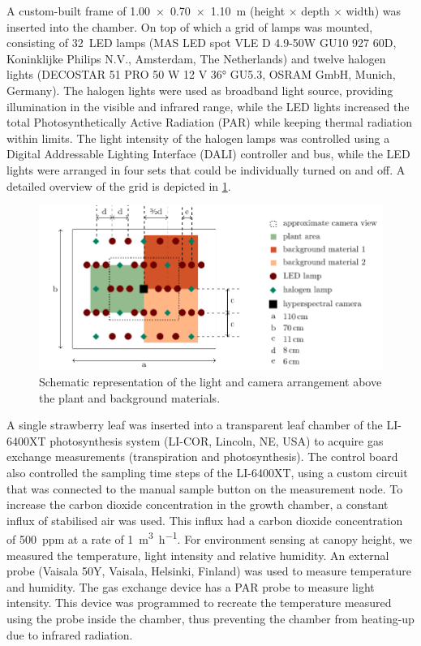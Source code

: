 \documentclass[10pt,authoryear,a4paper]{elsarticle}
\begin{document}
        A custom-built frame of \SI[product-units = single]{1.00 x 0.70 x 1.10}{\metre} (height $\times$ depth $\times$ width) was inserted into the chamber. On top of which a grid of lamps was mounted, consisting of 32~LED lamps (MAS LED spot VLE D 4.9-50W GU10 927 60D, Koninklijke Philips N.V., Amsterdam, The Netherlands) and twelve halogen lights (DECOSTAR 51 PRO 50 W 12 V \ang{36} GU5.3, OSRAM GmbH, Munich, Germany). The halogen lights were used as broadband light source, providing illumination in the visible and infrared range, while the LED lights increased the total Photosynthetically Active Radiation (PAR) while keeping thermal radiation within limits. The light intensity of the halogen lamps was controlled using a Digital Addressable Lighting Interface (DALI) controller and bus, while the LED lights were arranged in four sets that could be individually turned on and off. A detailed overview of the grid is depicted in \cref{lamp-configuration}.
        
        \begin{figure}[thb]
            \centering
            \includegraphics{figures/lamp-layout}
            \caption{Schematic representation of the light and camera arrangement above the plant and background materials.}
            \label{lamp-configuration}
        \end{figure}
        
        A single strawberry leaf was inserted into a transparent leaf chamber of the LI-6400XT photosynthesis system (LI-COR, Lincoln, NE, USA) to acquire gas exchange measurements (transpiration and photosynthesis). The control board also controlled the sampling time steps of the LI-6400XT, using a custom circuit that was connected to the manual sample button on the measurement node. To increase the carbon dioxide concentration in the growth chamber, a constant influx of stabilised air was used. This influx had a carbon dioxide concentration of \SI{500}{ppm} at a rate of \SI{1}{\cubic\metre \per\hour}. For environment sensing at canopy height, we measured the temperature, light intensity and relative humidity. An external probe (Vaisala 50Y, Vaisala, Helsinki, Finland) was used to measure temperature and humidity. The gas exchange device has a PAR probe to measure light intensity. This device was programmed to recreate the temperature measured using the probe inside the chamber, thus preventing the chamber from heating-up due to infrared radiation.
        
\end{document}
